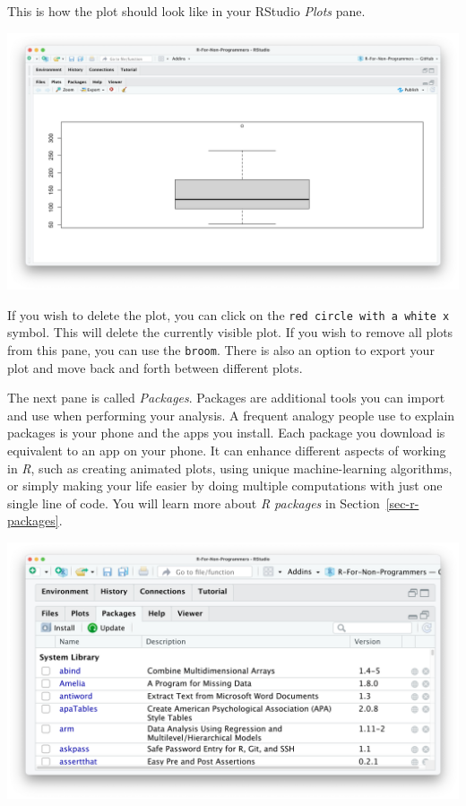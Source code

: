 \documentclass[
  letterpaper,
  DIV=11,
  numbers=noendperiod]{scrreprt}
\begin{document}
This is how the plot should look like in your RStudio \emph{Plots} pane.

\includegraphics{images/chapter_04_img/05_files_plots_etc/02_rstudio_plots.png}

If you wish to delete the plot, you can click on the
\texttt{red\ circle\ with\ a\ white\ x} symbol. This will delete the
currently visible plot. If you wish to remove all plots from this pane,
you can use the \texttt{broom}. There is also an option to export your
plot and move back and forth between different plots.

The next pane is called \emph{Packages}. Packages are additional tools
you can import and use when performing your analysis. A frequent analogy
people use to explain packages is your phone and the apps you install.
Each package you download is equivalent to an app on your phone. It can
enhance different aspects of working in \emph{R}, such as creating
animated plots, using unique machine-learning algorithms, or simply
making your life easier by doing multiple computations with just one
single line of code. You will learn more about \emph{R packages} in
Section~\ref{sec-r-packages}.

\includegraphics{images/chapter_04_img/05_files_plots_etc/03_rstudio_packages.png}
\end{document}
